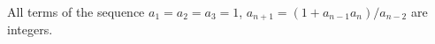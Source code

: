 All terms of the sequence $a_1 = a_2 = a_3 = 1$, $a_{n+1} = (1 + a_{n-1}a_n)/a_{n-2}$ are integers.

